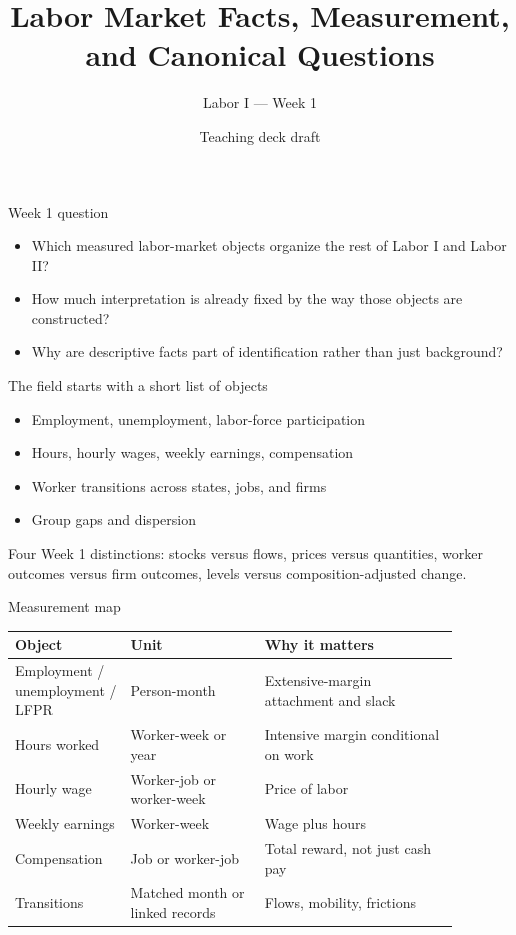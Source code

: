 \documentclass[aspectratio=169,11pt]{beamer}
\title{Labor Market Facts, Measurement, and Canonical Questions}
\subtitle{Labor I --- Week 1}
\author{Teaching deck draft}
\date{}
\begin{document}
\begin{frame}
  \titlepage
\end{frame}

\begin{frame}{Week 1 question}
\begin{itemize}
    \item Which measured labor-market objects organize the rest of Labor I and Labor II?
    \item How much interpretation is already fixed by the way those objects are constructed?
    \item Why are descriptive facts part of identification rather than just background?
\end{itemize}
\end{frame}

\begin{frame}{The field starts with a short list of objects}
\begin{itemize}
    \item Employment, unemployment, labor-force participation
    \item Hours, hourly wages, weekly earnings, compensation
    \item Worker transitions across states, jobs, and firms
    \item Group gaps and dispersion
\end{itemize}

\medskip
Four Week 1 distinctions: stocks versus flows, prices versus quantities, worker outcomes versus firm outcomes, levels versus composition-adjusted change.
\end{frame}

\begin{frame}{Measurement map}
\small
\begin{tabular}{p{0.22\linewidth} p{0.27\linewidth} p{0.39\linewidth}}
\toprule
Object & Unit & Why it matters \\
\midrule
Employment / unemployment / LFPR & Person-month & Extensive-margin attachment and slack \\
Hours worked & Worker-week or year & Intensive margin conditional on work \\
Hourly wage & Worker-job or worker-week & Price of labor \\
Weekly earnings & Worker-week & Wage plus hours \\
Compensation & Job or worker-job & Total reward, not just cash pay \\
Transitions & Matched month or linked records & Flows, mobility, frictions \\
\bottomrule
\end{tabular}
\end{frame}
\end{document}
